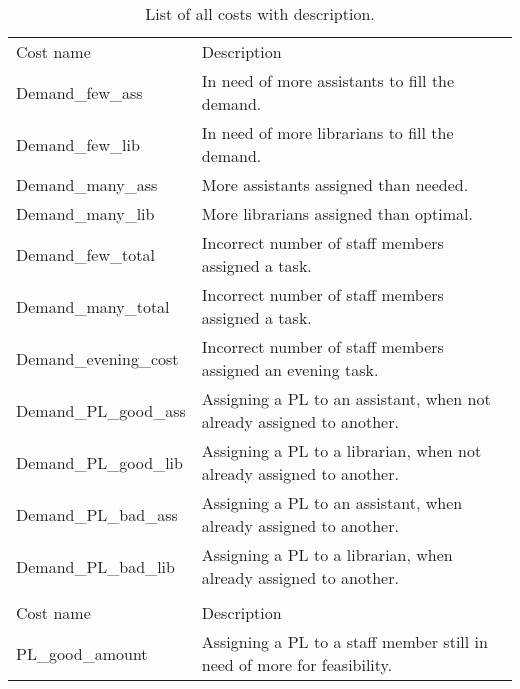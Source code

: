 \begin{table}[!h]
\centering
\caption{List of all costs with description.}
\label{tab:all_costs}
\begin{tabular}{|l|l|}
\hline
\rowcolor[HTML]{FD6864} 
\multicolumn{2}{|l|}{\cellcolor{corn} \textbf{Demand costs}} \\ \hline
\rowcolor[HTML]{C0C0C0} 
Cost name                                      & Description       \\ \hline
Demand\_few\_ass                        & In need of more assistants to fill the demand.                  \\ \hline
Demand\_few\_lib                        & In need of more librarians to fill the demand.                 \\ \hline
Demand\_many\_ass                       & More assistants assigned than needed.           \\ \hline
Demand\_many\_lib                       & More librarians assigned than optimal.                  \\ \hline
Demand\_few\_total                             & Incorrect number of staff members assigned a task.                  \\ \hline
Demand\_many\_total                            & Incorrect number of staff members assigned a task.                  \\ \hline
Demand\_evening\_cost         & Incorrect number of staff members assigned an evening task.\\ \hline
Demand\_PL\_good\_ass        & Assigning a PL to an assistant, when not already assigned to another.      \\ \hline
Demand\_PL\_good\_lib        & Assigning a PL to a librarian, when not already assigned to another.       \\ \hline
Demand\_PL\_bad\_ass         & Assigning a PL to an assistant, when already assigned to another.          \\ \hline
Demand\_PL\_bad\_lib         & Assigning a PL to a librarian, when already assigned to another.          \\ \hline
\rowcolor[HTML]{FD6864} 
\multicolumn{2}{|l|}{\cellcolor{corn} \textbf{PL costs}} \\ \hline
\rowcolor[HTML]{C0C0C0} 
Cost name                                      & Description       \\ \hline
PL\_good\_amount                  & Assigning a PL to a staff member still in need of more for feasibility.\\ \hline

\end{tabular}
\end{table}
